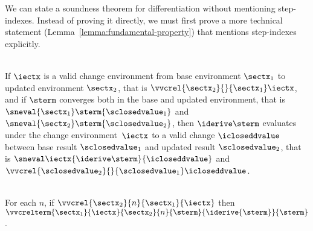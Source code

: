 We can state a soundness theorem for differentiation without
mentioning step-indexes. Instead of proving it directly, we must first
prove a more technical statement
(Lemma~\ref{lemma:fundamental-property}) that mentions step-indexes
explicitly.
%
\begin{theorem}
  \label{thm:sound-derive}
  \-\\
  If $\iectx$ is a valid change environment from base environment $\sectx_1$ to
  updated environment $\sectx_2$, that is $\vvcrel {\sectx_2} {} {\sectx_1}\iectx$,
  and if $\sterm$ converges both in the base and updated environment, that is
  $\sneval{\sectx_1}\sterm{\sclosedvalue_1}$ and
  $\sneval{\sectx_2}\sterm{\sclosedvalue_2}$,
  then $\iderive\sterm$ evaluates under the change environment~$\iectx$ to a valid
  change $\icloseddvalue$ between base result ${\sclosedvalue_1}$ and updated result
  ${\sclosedvalue_2}$, that is
  $\sneval\iectx{\iderive\sterm}{\icloseddvalue}$ and
  $\vvcrel{\sclosedvalue_2} {} {\sclosedvalue_1}
  \icloseddvalue$.
\end{theorem}

\begin{lemma}
  \label{lemma:fundamental-property}
  \-\\
For each $n$,
if $\vvcrel{\sectx_2}{n}{\sectx_1}{\iectx}$ then
$\vvcrelterm{\sectx_1}{\iectx}{\sectx_2}{n}{\sterm}{\iderive{\sterm}}{\sterm}$.
\end{lemma}
